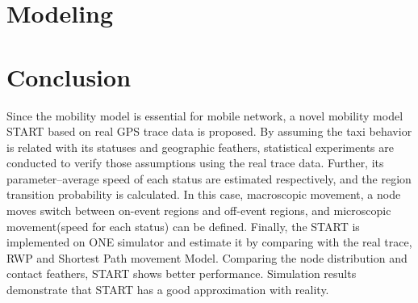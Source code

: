 \documentclass[letterpaper,twocolumn,10pt]{IEEEtran}
\begin{document}






\section{Modeling}
\label{section_modeling}








\section{Conclusion}
\label{section_conclusion}
Since the mobility model is essential for mobile network, a novel mobility model START based on real GPS trace data is proposed. By assuming the taxi behavior is related with its statuses and geographic feathers, statistical experiments are conducted to verify those assumptions using the real trace data. Further, its parameter--average speed of each status are estimated respectively, and the region transition probability is calculated. In this case, macroscopic movement, a node moves switch between on-event regions and off-event regions, and microscopic movement(speed for each status) can be defined. Finally, the START is implemented on ONE simulator and estimate it by comparing with the real trace, RWP and Shortest Path movement Model.
Comparing the node distribution and contact feathers, START shows better performance.
Simulation results demonstrate that START has a good approximation with reality.






\end{document}
